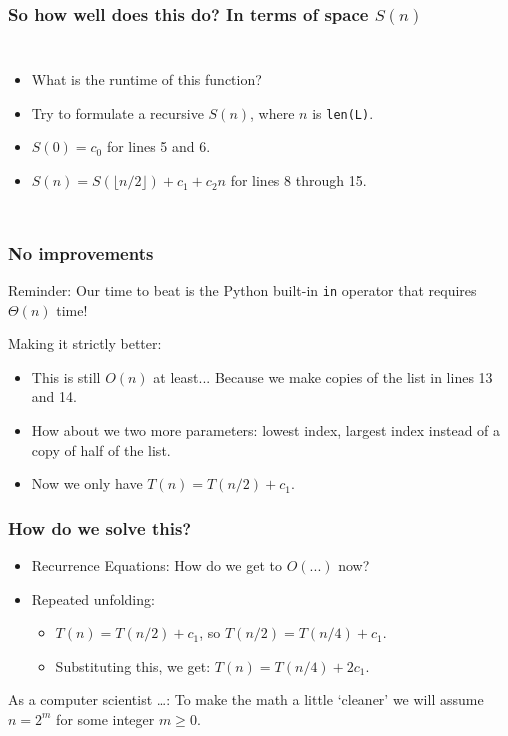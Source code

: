 \begin{frame}
	\frametitle{So how well does this do? In terms of space $S(n)$}

		\begin{columns}
				
				\begin{itemize}
					\item What is the runtime of this function? 
					\item Try to formulate a recursive $S(n)$, where $n$ is \texttt{len(L)}.
					\item $S(0) = c_0$ for lines 5 and 6.\\
					\item $S(n) = S(\lfloor n/2 \rfloor) + c_1 + c_2n$ for lines 8 through 15.
			\end{itemize}
		\end{columns}
\end{frame}

\begin{frame}
	\frametitle{No improvements}
Reminder:
			Our time to beat is the Python built-in \texttt{in} operator that requires $\Theta(n)$ time!

Making it strictly better:
				\begin{itemize}
					\item This is still $O(n)$ at least... Because we make copies of the list in lines 13 and 14.
					\item How about we two more parameters: lowest index, largest index instead of a copy of half of the list.
					\item Now we only have $T(n) = T(n/2) + c_1$.
		\end{itemize}	
\end{frame}

\begin{frame}
	\frametitle{How do we solve this?}

				\begin{itemize}
					\item Recurrence Equations: How do we get to $O(...)$ now?
	
					\item Repeated unfolding:
				\begin{itemize}
					\item $T(n) = T(n/2) +c_1$, so $T(n/2) = T(n/4) + c_1$.
					\item Substituting this, we get: $T(n) = T(n/4) + 2c_1$.
		\end{itemize}	
					
	\end{itemize}
	
As a computer scientist \ldots:
		To make the math a little `cleaner' we will assume $n = 2^m$ for some integer $m \geq 0$.	
\end{frame}

